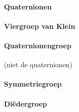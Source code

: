\paragraph{Quaternionen}
\paragraph{Viergroep van Klein}
\paragraph{Quaternionengroep} (niet de quaternionen)
\paragraph{Symmetriegroep}
\paragraph{Diëdergroep}